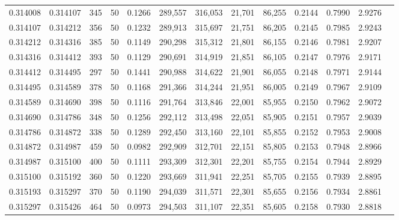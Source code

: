 \begin{tabular}{rrrrrrrrrrrrr}
0.314008 & 0.314107 &   345 &  50 &                                     0.1266 & 289,557 & 316,053 &  21,701 &  86,255 & 0.2144 & 0.7990 & 2.9276 \\
0.314107 & 0.314212 &   356 &  50 &                                     0.1232 & 289,913 & 315,697 &  21,751 &  86,205 & 0.2145 & 0.7985 & 2.9243 \\
0.314212 & 0.314316 &   385 &  50 &                                     0.1149 & 290,298 & 315,312 &  21,801 &  86,155 & 0.2146 & 0.7981 & 2.9207 \\
0.314316 & 0.314412 &   393 &  50 &                                     0.1129 & 290,691 & 314,919 &  21,851 &  86,105 & 0.2147 & 0.7976 & 2.9171 \\
0.314412 & 0.314495 &   297 &  50 &                                     0.1441 & 290,988 & 314,622 &  21,901 &  86,055 & 0.2148 & 0.7971 & 2.9144 \\
0.314495 & 0.314589 &   378 &  50 &                                     0.1168 & 291,366 & 314,244 &  21,951 &  86,005 & 0.2149 & 0.7967 & 2.9109 \\
0.314589 & 0.314690 &   398 &  50 &                                     0.1116 & 291,764 & 313,846 &  22,001 &  85,955 & 0.2150 & 0.7962 & 2.9072 \\
0.314690 & 0.314786 &   348 &  50 &                                     0.1256 & 292,112 & 313,498 &  22,051 &  85,905 & 0.2151 & 0.7957 & 2.9039 \\
0.314786 & 0.314872 &   338 &  50 &                                     0.1289 & 292,450 & 313,160 &  22,101 &  85,855 & 0.2152 & 0.7953 & 2.9008 \\
0.314872 & 0.314987 &   459 &  50 &                                     0.0982 & 292,909 & 312,701 &  22,151 &  85,805 & 0.2153 & 0.7948 & 2.8966 \\
0.314987 & 0.315100 &   400 &  50 &                                     0.1111 & 293,309 & 312,301 &  22,201 &  85,755 & 0.2154 & 0.7944 & 2.8929 \\
0.315100 & 0.315192 &   360 &  50 &                                     0.1220 & 293,669 & 311,941 &  22,251 &  85,705 & 0.2155 & 0.7939 & 2.8895 \\
0.315193 & 0.315297 &   370 &  50 &                                     0.1190 & 294,039 & 311,571 &  22,301 &  85,655 & 0.2156 & 0.7934 & 2.8861 \\
0.315297 & 0.315426 &   464 &  50 &                                     0.0973 & 294,503 & 311,107 &  22,351 &  85,605 & 0.2158 & 0.7930 & 2.8818 \\

\end{tabular}
